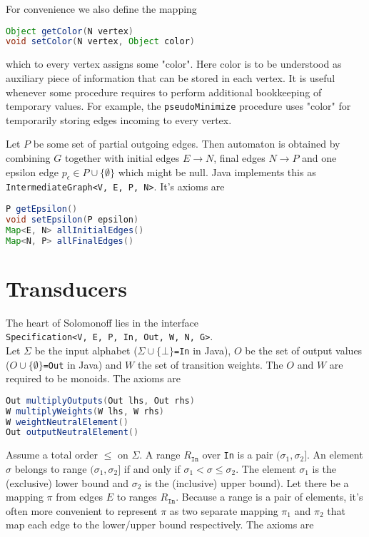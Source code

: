 \documentclass[12pt]{article}
\begin{document}
For convenience we also define the mapping 
 \begin{lstlisting}[language=java]
Object getColor(N vertex)
void setColor(N vertex, Object color)
\end{lstlisting}
 which to every vertex assigns some "color". Here color is to be understood as auxiliary piece of information that can be stored in each vertex. It is useful whenever some procedure requires to perform additional bookkeeping of temporary values. For example, the \texttt{pseudoMinimize} procedure uses "color" for temporarily storing edges incoming to every vertex. 
 
Let $P$ be some set of partial outgoing edges. Then automaton is obtained by combining $G$ together with initial edges $E \rightarrow N$, final edges $N\rightarrow P$ and one epsilon edge $p_\epsilon \in P \cup \{\emptyset\}$ which might be null. Java implements this as \texttt{IntermediateGraph<V, E, P, N>}. 
It's axioms are
 
 \begin{lstlisting}[language=java]
P getEpsilon()
void setEpsilon(P epsilon)
Map<E, N> allInitialEdges()
Map<N, P> allFinalEdges()
 \end{lstlisting}


 \section{Transducers}
 
 The heart of Solomonoff lies in the interface \\
 \texttt{Specification<V, E, P, In, Out, W, N, G>}. \\
 Let $\Sigma$ be the input alphabet ($\Sigma \cup \{\bot\}$\texttt{=In} in Java), $O$ be the set of output values ($O\cup\{\emptyset\}$\texttt{=Out} in Java) and $W$ the set of transition weights. The $O$ and $W$ are required to be monoids. The axioms are
  
 \begin{lstlisting}[language=java]
Out multiplyOutputs(Out lhs, Out rhs)
W multiplyWeights(W lhs, W rhs)
W weightNeutralElement()
Out outputNeutralElement()
 \end{lstlisting}
 

 
 Assume a total order $\le$ on $\Sigma$. A range $R_\texttt{In}$ over \texttt{In} is a pair $(\sigma_1,\sigma_2]$. An element $\sigma$ belongs to range $(\sigma_1,\sigma_2]$ if and only if $\sigma_1<\sigma\le\sigma_2$. The element $\sigma_1$ is the (exclusive) lower bound and $\sigma_2$ is the (inclusive) upper bound). Let there be a mapping $\pi$ from edges $E$ to ranges $R_\texttt{In}$. Because a range is a pair of elements, it's often more convenient to represent $\pi$ as two separate mapping $\pi_1$ and $\pi_2$ that map each edge to the lower/upper bound respectively. The axioms are
   
\end{document}
